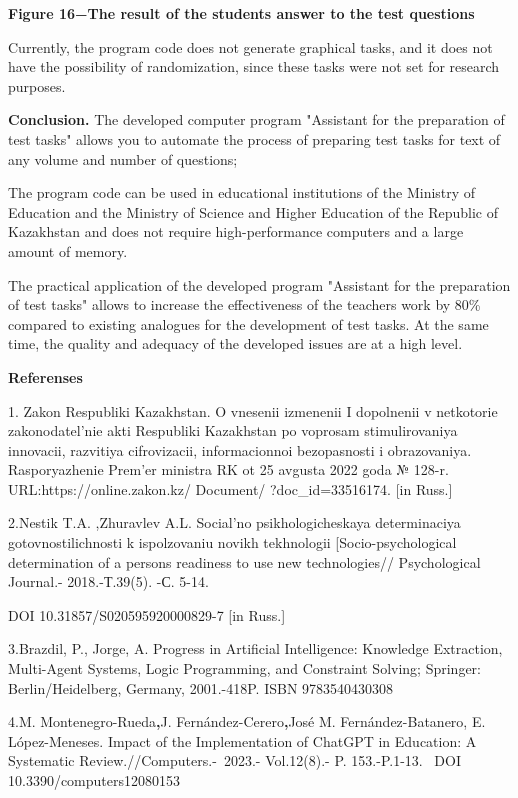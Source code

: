 {\bfseries Figure 16−The result of the student\textquotesingle s answer to
the test questions}

Currently, the program code does not generate graphical tasks, and it
does not have the possibility of randomization, since these tasks were
not set for research purposes.

{\bfseries Conclusion.} The developed computer program "Assistant for the
preparation of test tasks" allows you to automate the process of
preparing test tasks for text of any volume and number of questions;

The program code can be used in educational institutions of the Ministry
of Education and the Ministry of Science and Higher Education of the
Republic of Kazakhstan and does not require high-performance computers
and a large amount of memory.

The practical application of the developed program "Assistant for the
preparation of test tasks" allows to increase the effectiveness of the
teacher\textquotesingle s work by 80\% compared to existing analogues
for the development of test tasks. At the same time, the quality and
adequacy of the developed issues are at a high level.

{\bfseries Referenses}

1. Zakon Respubliki Kazakhstan. O vnesenii izmenenii I dopolnenii v
netkotorie zakonodatel'nie akti Respubliki Kazakhstan po voprosam
stimulirovaniya innovacii, razvitiya cifrovizacii, informacionnoi
bezopasnosti i obrazovaniya. Rasporyazhenie Prem'er ministra RK ot 25
avgusta 2022 goda № 128-r. URL:https://online.zakon.kz/ Document/
?doc\_id=33516174. {[}in Russ.{]}

2.Nestik T.A. ,Zhuravlev A.L. Social'no psikhologicheskaya determinaciya
gotovnostilichnosti k ispolzovaniu novikh tekhnologii
{[}Socio-psychological determination of a person\textquotesingle s
readiness to use new technologies// Psychological Journal.-
2018.-Т.39(5). -С. 5-14.

DOI 10.31857/S020595920000829-7 {[}in Russ.{]}

3.Brazdil, P., Jorge, A. Progress in Artificial Intelligence: Knowledge
Extraction, Multi-Agent Systems, Logic Programming, and Constraint
Solving; Springer: Berlin/Heidelberg, Germany, 2001.-418P. ISBN
9783540430308

4.M. Montenegro-Rueda{\bfseries ,}J. Fernández-Cerero{\bfseries ,}José M.
Fernández-Batanero, E. López-Meneses. Impact of the Implementation of
ChatGPT in Education: A Systematic Review.//Computers.-\emph{~}2023.-
Vol.12(8).- P. 153.-P.1-13. ~DOI 10.3390/computers12080153

